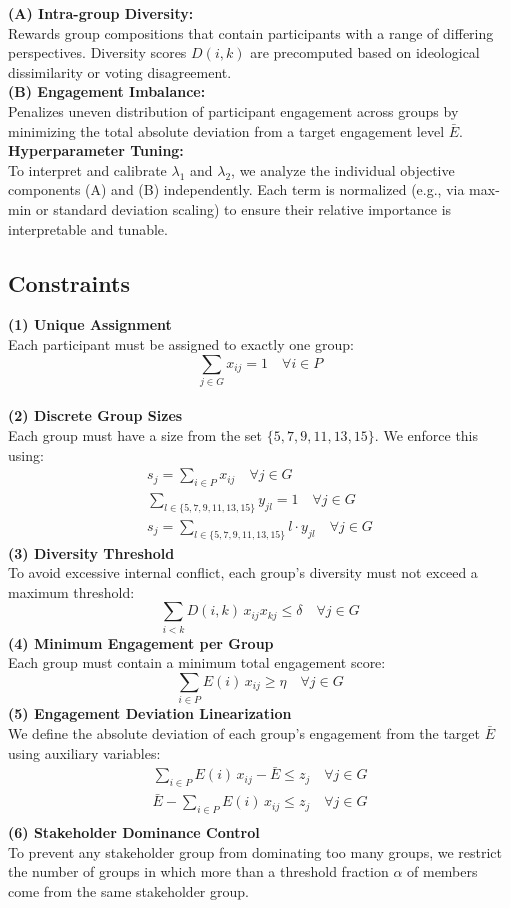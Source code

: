 \noindent
\textbf{(A) Intra-group Diversity:}\\[3pt]
Rewards group compositions that contain participants with a range of differing perspectives.
Diversity scores \(D(i,k)\) are precomputed based on ideological dissimilarity or voting disagreement.
\\
\textbf{(B) Engagement Imbalance:}\\[3pt]
Penalizes uneven distribution of participant engagement across groups by minimizing the total absolute deviation
from a target engagement level \(\bar{E}\).
\\
\textbf{Hyperparameter Tuning:}\\[3pt]
To interpret and calibrate \(\lambda_1\) and \(\lambda_2\), we analyze the individual objective components (A)
and (B) independently.
Each term is normalized (e.g., via max-min or standard deviation scaling)
to ensure their relative importance is interpretable and tunable.

\subsection*{Constraints}
\textbf{(1) Unique Assignment}\\[3pt]
Each participant must be assigned to exactly one group:
\[
\sum_{j \in G} x_{ij} = 1 \quad \forall i \in P
\]
\\
\textbf{(2) Discrete Group Sizes}\\[3pt]
Each group must have a size from the set \(\{5,7,9,11,13,15\}\).
We enforce this using:
\begin{gather*}
    s_j = \sum_{i \in P} x_{ij} \quad \forall j \in G\\
    \sum_{l \in \{5,7,9,11,13,15\}} y_{jl} = 1 \quad \forall j \in G\\
    s_j = \sum_{l \in \{5,7,9,11,13,15\}} l \cdot y_{jl} \quad \forall j \in G
\end{gather*}
\textbf{(3) Diversity Threshold}\\[3pt]
To avoid excessive internal conflict, each group's diversity must not exceed a maximum threshold:
\[
\sum_{i < k} D(i,k)\,x_{ij} x_{kj} \leq \delta \quad \forall j \in G
\]
\textbf{(4) Minimum Engagement per Group}\\[3pt]
Each group must contain a minimum total engagement score:
\[
\sum_{i \in P} E(i)\,x_{ij} \geq \eta \quad \forall j \in G
\]
\textbf{(5) Engagement Deviation Linearization}\\[3pt]
We define the absolute deviation of each group's engagement from the target \(\bar{E}\) using auxiliary variables:
\begin{gather*}
    \sum_{i \in P} E(i)\,x_{ij} - \bar{E} \leq z_j \quad \forall j \in G\\
    \bar{E} - \sum_{i \in P} E(i)\,x_{ij} \leq z_j \quad \forall j \in G\\
\end{gather*}
\textbf{(6) Stakeholder Dominance Control}\\[3pt]
To prevent any stakeholder group from dominating too many groups, we restrict the number of groups
in which more than a threshold fraction \(\alpha\) of members come from the same stakeholder group.

